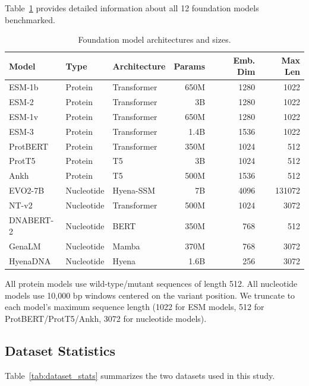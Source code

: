 \documentclass[9pt]{article}
\begin{document}
Table~\ref{tab:model_details} provides detailed information about all 12 foundation models benchmarked.

\begin{table}[h]
\centering
\caption{Foundation model architectures and sizes.}
\label{tab:model_details}
\small
\begin{tabular}{lllrrr}
\toprule
\textbf{Model} & \textbf{Type} & \textbf{Architecture} & \textbf{Params} & \textbf{Emb. Dim} & \textbf{Max Len} \\
\midrule
ESM-1b & Protein & Transformer & 650M & 1280 & 1022 \\
ESM-2 & Protein & Transformer & 3B & 1280 & 1022 \\
ESM-1v & Protein & Transformer & 650M & 1280 & 1022 \\
ESM-3 & Protein & Transformer & 1.4B & 1536 & 1022 \\
ProtBERT & Protein & Transformer & 350M & 1024 & 512 \\
ProtT5 & Protein & T5 & 3B & 1024 & 512 \\
Ankh & Protein & T5 & 500M & 1536 & 512 \\
\midrule
EVO2-7B & Nucleotide & Hyena-SSM & 7B & 4096 & 131072 \\
NT-v2 & Nucleotide & Transformer & 500M & 1024 & 3072 \\
DNABERT-2 & Nucleotide & BERT & 350M & 768 & 512 \\
GenaLM & Nucleotide & Mamba & 370M & 768 & 3072 \\
HyenaDNA & Nucleotide & Hyena & 1.6B & 256 & 3072 \\
\bottomrule
\end{tabular}
\end{table}

All protein models use wild-type/mutant sequences of length 512. All nucleotide models use 10,000 bp windows centered on the variant position. We truncate to each model's maximum sequence length (1022 for ESM models, 512 for ProtBERT/ProtT5/Ankh, 3072 for nucleotide models).

\subsection{Dataset Statistics}

Table~\ref{tab:dataset_stats} summarizes the two datasets used in this study.
\end{document}
